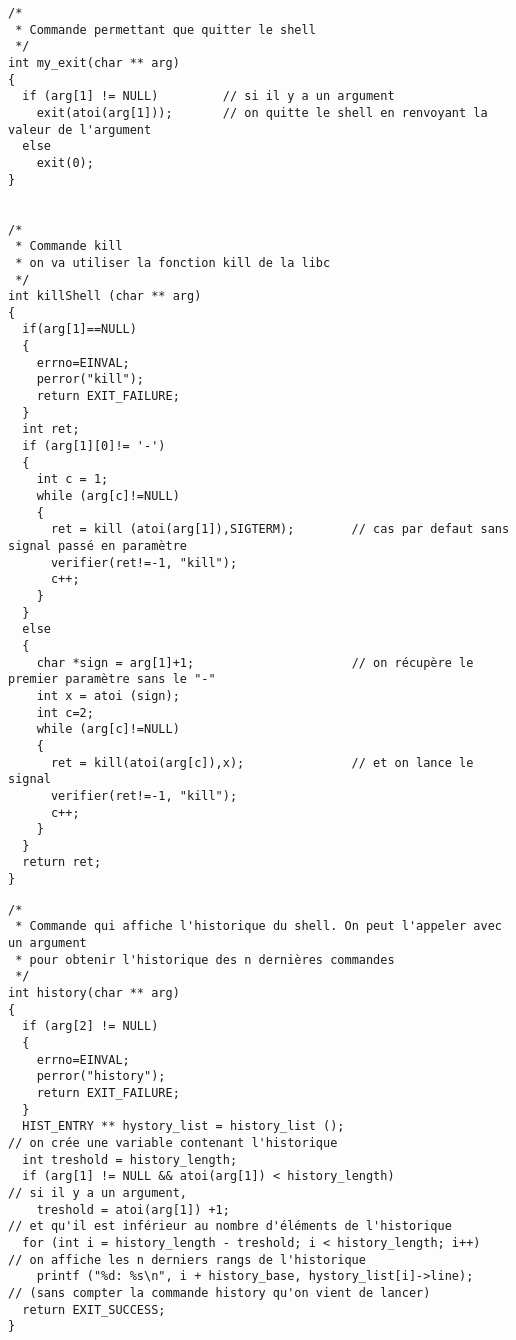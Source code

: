 \documentclass[12pt]{article}
\begin{document}
\label{exit et kill}
\begin{verbatim}
/*
 * Commande permettant que quitter le shell
 */
int my_exit(char ** arg) 
{
  if (arg[1] != NULL)         // si il y a un argument
    exit(atoi(arg[1]));       // on quitte le shell en renvoyant la valeur de l'argument
  else
    exit(0);
}


/*
 * Commande kill
 * on va utiliser la fonction kill de la libc
 */
int killShell (char ** arg)
{
  if(arg[1]==NULL)
  {
    errno=EINVAL;
    perror("kill");
    return EXIT_FAILURE;
  }
  int ret;
  if (arg[1][0]!= '-')
  {
    int c = 1;
    while (arg[c]!=NULL)
    {
      ret = kill (atoi(arg[1]),SIGTERM);        // cas par defaut sans signal passé en paramètre
      verifier(ret!=-1, "kill");
      c++;
    }
  }
  else
  {
    char *sign = arg[1]+1;                      // on récupère le premier paramètre sans le "-"
    int x = atoi (sign);
    int c=2;
    while (arg[c]!=NULL)
    {
      ret = kill(atoi(arg[c]),x);               // et on lance le signal
      verifier(ret!=-1, "kill");
      c++;
    }
  }
  return ret;
}

\end{verbatim}
\label{history}
\begin{verbatim}
/*
 * Commande qui affiche l'historique du shell. On peut l'appeler avec un argument
 * pour obtenir l'historique des n dernières commandes 
 */
int history(char ** arg) 
{
  if (arg[2] != NULL)
  {
    errno=EINVAL;
    perror("history");
    return EXIT_FAILURE;
  }
  HIST_ENTRY ** hystory_list = history_list ();                       // on crée une variable contenant l'historique
  int treshold = history_length;
  if (arg[1] != NULL && atoi(arg[1]) < history_length)                // si il y a un argument, 
    treshold = atoi(arg[1]) +1;                                       // et qu'il est inférieur au nombre d'éléments de l'historique
  for (int i = history_length - treshold; i < history_length; i++)    // on affiche les n derniers rangs de l'historique
    printf ("%d: %s\n", i + history_base, hystory_list[i]->line);     // (sans compter la commande history qu'on vient de lancer)
  return EXIT_SUCCESS;
}
\end{verbatim}
\end{document}
